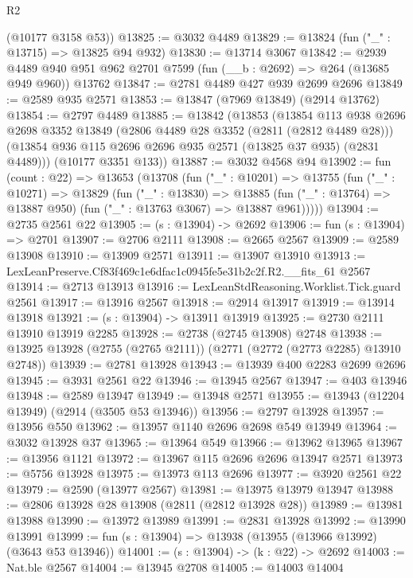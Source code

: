 \begin{lexlean}{R2}
\begin{coremodule}
      (@10177 @3158 @53))
@13825 := @3032 @4489
@13829 := @13824 (fun ("_" : @13715) => @13825 @94 @932)
@13830 := @13714 @3067
@13842 := @2939
    @4489
    @940
    @951
    @962
    @2701
    @7599
    (fun (__b : @2692) => @264 (@13685 @949 @960))
    @13762
@13847 := @2781 @4489 @427 @939 @2699 @2696
@13849 := @2589 @935 @2571
@13853 := @13847 (@7969 @13849) (@2914 @13762)
@13854 := @2797 @4489
@13885 := @13842
    (@13853
      (@13854
        @113
        @938
        @2696
        @2698
        @3352
        @13849
        (@2806 @4489 @28 @3352 (@2811 (@2812 @4489 @28)))
        (@13854 @936 @115 @2696 @2696 @935 @2571 (@13825 @37 @935) (@2831 @4489)))
      (@10177 @3351 @133))
@13887 := @3032 @4568 @94
@13902 := fun (count : @22) =>
  @13653
    (@13708
      (fun ("_" : @10201) =>
      @13755
        (fun ("_" : @10271) =>
        @13829
          (fun ("_" : @13830) =>
          @13885 (fun ("_" : @13764) => @13887 @950) (fun ("_" : @13763 @3067) => @13887 @961)))))
@13904 := @2735 @2561 @22
@13905 := (s : @13904) -> @2692
@13906 := fun (s : @13904) => @2701
@13907 := @2706 @2111
@13908 := @2665 @2567
@13909 := @2589 @13908
@13910 := @13909 @2571
@13911 := @13907 @13910
@13913 := LexLeanPreserve.Cf83f469c1e6dfac1c0945fe5e31b2c2f.R2.__fits_61 @2567
@13914 := @2713 @13913
@13916 := LexLeanStdReasoning.Worklist.Tick.guard @2561
@13917 := @13916 @2567
@13918 := @2914 @13917
@13919 := @13914 @13918
@13921 := (s : @13904) -> @13911 @13919
@13925 := @2730 @2111 @13910 @13919 @2285
@13928 := @2738 (@2745 @13908) @2748
@13938 := @13925 @13928 (@2755 (@2765 @2111)) (@2771 (@2772 (@2773 @2285) @13910 @2748))
@13939 := @2781 @13928
@13943 := @13939 @400 @2283 @2699 @2696
@13945 := @3931 @2561 @22
@13946 := @13945 @2567
@13947 := @403 @13946
@13948 := @2589 @13947
@13949 := @13948 @2571
@13955 := @13943 (@12204 @13949) (@2914 (@3505 @53 @13946))
@13956 := @2797 @13928
@13957 := @13956 @550
@13962 := @13957 @1140 @2696 @2698 @549 @13949
@13964 := @3032 @13928 @37
@13965 := @13964 @549
@13966 := @13962 @13965
@13967 := @13956 @1121
@13972 := @13967 @115 @2696 @2696 @13947 @2571
@13973 := @5756 @13928
@13975 := @13973 @113 @2696
@13977 := @3920 @2561 @22
@13979 := @2590 (@13977 @2567)
@13981 := @13975 @13979 @13947
@13988 := @2806 @13928 @28 @13908 (@2811 (@2812 @13928 @28))
@13989 := @13981 @13988
@13990 := @13972 @13989
@13991 := @2831 @13928
@13992 := @13990 @13991
@13999 := fun (s : @13904) => @13938 (@13955 (@13966 @13992) (@3643 @53 @13946))
@14001 := (s : @13904) -> (k : @22) -> @2692
@14003 := Nat.ble @2567
@14004 := @13945 @2708
@14005 := @14003 @14004

\end{coremodule}
\end{lexlean}
